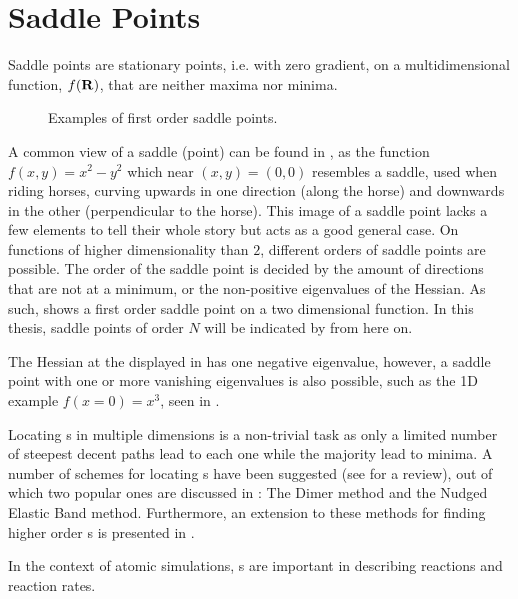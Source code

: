 \section{Saddle Points}
\label{sec:sps}
Saddle points are stationary points, i.e. with zero gradient, on a multidimensional function, $f({\mathrm{\mathbf{\bm{R}}}})$, that are neither maxima nor minima.

\begin{figure}[h]
  \begin{center}
    \parbox{0.85\linewidth}{
      \caption{Examples of first order saddle points.
      }
      \label{fig:saddle-points}
    }
  \end{center}
\end{figure}

A common view of a saddle (point) can be found in , as the function $f(x, y) = x^2 - y^2$ which near $(x,y) = (0,0)$ resembles a saddle, used when riding horses, curving upwards in one direction (along the horse) and downwards in the other (perpendicular to the horse).
This image of a saddle point lacks a few elements to tell their whole story but acts as a good general case.
On functions of higher dimensionality than $2$, different orders of saddle points are possible.
The order of the saddle point is decided by the amount of directions that are not at a minimum, or the non-positive eigenvalues of the Hessian.
As such,  shows a first order saddle point on a two dimensional function.
In this thesis, saddle points of order $N$ will be indicated by  from here on.

The Hessian at the \sap{} displayed in  has one negative eigenvalue, however, a saddle point with one or more vanishing eigenvalues is also possible, such as the 1D example $f(x = 0) = x^3$, seen in .

Locating \sap{}s in multiple dimensions is a non-trivial task as only a limited number of steepest decent paths lead to each one while the majority lead to minima.
A number of schemes  for locating s have been suggested (see \cite{sp-mep-review-2002} for a review), out of which two popular ones are discussed in : The Dimer method and the Nudged Elastic Band method.
Furthermore, an extension to these methods for finding higher order \sap{}s is presented in .

In the context of atomic simulations, \sap{}s are important in describing reactions and reaction rates.
